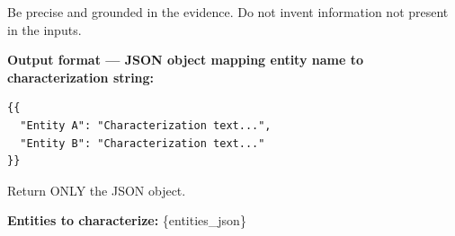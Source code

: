 \begin{tcolorbox}[breakable,enhanced,colback=blue!3,colframe=blue!40!black,title={Prompt},fonttitle=\bfseries,left=8pt,right=8pt,top=6pt,bottom=6pt]
Be precise and grounded in the evidence. Do not invent information not present in the inputs.

\textbf{Output format --- JSON object mapping entity name to characterization string:}
\begin{verbatim}
{{
  "Entity A": "Characterization text...",
  "Entity B": "Characterization text..."
}}
\end{verbatim}

Return ONLY the JSON object.

\textbf{Entities to characterize:}
\{entities\_json\}
\end{tcolorbox}
